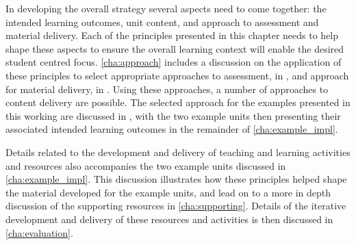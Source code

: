 
In developing the overall strategy several aspects need to come together: the intended learning outcomes, unit content, and approach to assessment and material delivery. Each of the principles presented in this chapter needs to help shape these aspects to ensure the overall learning context will enable the desired student centred focus. \cref{cha:approach} includes a discussion on the application of these principles to select appropriate approaches to assessment, in , and approach for material delivery, in . Using these approaches, a number of approaches to content delivery are possible. The selected approach for the examples presented in this working are discussed in , with the two example units then presenting their associated intended learning outcomes in the remainder of \cref{cha:example_impl}.

Details related to the development and delivery of teaching and learning activities and resources also accompanies the two example units discussed in \cref{cha:example_impl}. This discussion illustrates how these principles helped shape the material developed for the example units, and lead on to a more in depth discussion of the supporting resources in \cref{cha:supporting}. Details of the iterative development and delivery of these resources and activities is then discussed in \cref{cha:evaluation}.







